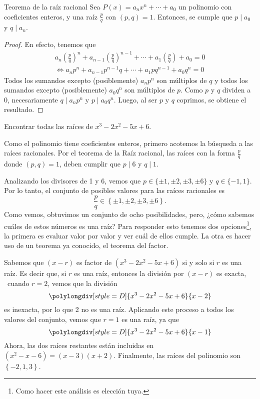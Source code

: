 \begin{theorem.tcb}{Teorema de la raíz racional}{}
    Sea $P(x) = a_n x^n + \cdots + a_0$ un polinomio con coeficientes enteros, y una raíz $\frac{p}{q}$ con $(p,q) = 1$.
    Entonces, se cumple que $p \mid a_0$ y $q \mid a_n$.
\end{theorem.tcb}
\begin{proof}
    En efecto, tenemos que
    \begin{align*}
        a_n \left(\frac{p}{q}\right)^n + a_{n - 1} \left(\frac{p}{q}\right)^{n - 1} + \cdots + a_1 \left(\frac{p}{q}\right) + a_0 = 0\\[1.2mm]
        \iff a_n p^n + a_{n - 1} p^{n - 1}q + \cdots + a_1 p q^{n - 1} + a_0 q^n = 0
    \end{align*}
    Todos los sumandos excepto (posiblemente) $a_n p^n$ son múltiplos de $q$ y todos los sumandos excepto (posiblemente) $a_0 q^n$ son múltiplos de $p$.
    Como $p$ y $q$ dividen a 0, necesariamente $q \mid a_n p^n$ y $p \mid a_0 q^n$.
    Luego, al ser $p$ y $q$ coprimos, se obtiene el resultado.
\end{proof}


\begin{example}
    Encontrar todas las raíces de $x^3 - 2x^2 - 5x + 6$.
\end{example}
\begin{solution}
    Como el polinomio tiene coeficientes enteros, primero acotemos la búsqueda a las raíces racionales.
    Por el teorema de la Raíz racional, las raíces con la forma $\frac{p}{q}$ donde $(p,q) = 1$, deben cumplir que $p \mid 6$ y $q \mid 1$.

    Analizando los divisores de 1 y 6, vemos que $p \in \{\pm 1, \pm 2, \pm 3, \pm6\}$ y $q \in \{-1, 1\}$.
    Por lo tanto, el conjunto de posibles valores para las raíces racionales es
    \[
        \frac{p}{q} \in \left\{ \pm 1, \pm 2, \pm 3, \pm 6 \right\}.
    \]
    Como vemos, obtuvimos un conjunto de ocho posibilidades, pero, ¿cómo sabemos cuáles de estos números es una raíz?
    Para responder esto tenemos dos opciones\footnote{Como hacer este análisis es elección tuya.}, la primera es evaluar valor por valor y ver cuál de ellos cumple.
    La otra es hacer uso de un teorema ya conocido, el teorema del factor.

    Sabemos que $(x - r)$ es factor de $(x^3 - 2x^2 - 5x + 6)$ si y solo si $r$ es una raíz.
    Es decir que, si $r$ es una raíz, entonces la división por $(x - r)$ es exacta, \eg\ cuando $r = 2$, vemos que la división
    \[
        \polylongdiv[style=D]{x^3 - 2x^2 - 5x + 6}{x - 2}
    \]
    es inexacta, por lo que 2 no es una raíz.
    Aplicando este proceso a todos los valores del conjunto, vemos que $r = 1$ es una raíz, ya que
    \[
        \polylongdiv[style=D]{x^3 - 2x^2 - 5x + 6}{x - 1}
    \]
    Ahora, las dos raíces restantes están incluidas en $(x^2 - x - 6) = (x - 3)(x + 2)$.
    Finalmente, las raíces del polinomio son $\left\{ -2, 1, 3 \right\}$.
\end{solution}

